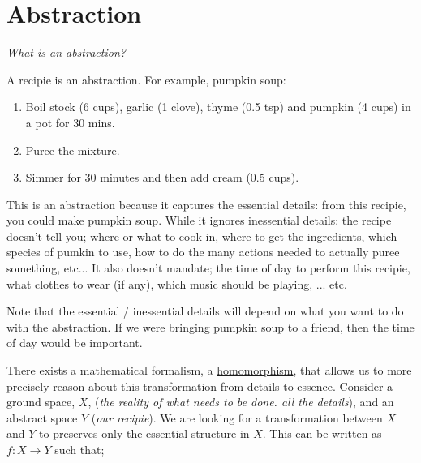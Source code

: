 \chapter{Abstraction}\label{C:abstraction}


\begin{displayquote}
 \textit{What is an abstraction?}
\end{displayquote}

A recipie is an abstraction. For example, pumpkin soup:

\begin{enumerate}
\tightlist
\item Boil stock (6 cups), garlic (1 clove), thyme (0.5 tsp) and pumpkin (4 cups) in a pot for 30 mins.
\item Puree the mixture.
\item Simmer for 30 minutes and then add cream (0.5 cups).
\end{enumerate}

This is an abstraction because it captures the essential details: from this recipie, you could make pumpkin soup.
While it ignores inessential details: the recipe doesn't tell you; where or what to cook in, where to get the
ingredients, which species of pumkin to use, how to do the many actions needed to actually puree something, etc...
It also doesn't mandate; the time of day to perform this recipie, what clothes to wear (if any),
which music should be playing, ... etc.

Note that the essential / inessential details will depend on what you want to do with the abstraction.
If we were bringing pumpkin soup to a friend, then the time of day would be important.

\vspace{5mm}

There exists a mathematical formalism, a  \href{https://en.wikipedia.org/wiki/Homomorphism}{homomorphism},
that allows us to more precisely reason about this transformation from
details to essence. Consider a ground space, $X$, (\textit{the reality of what
needs to be done. all the details}), and an abstract space $Y$ (\textit{our recipie}).
We are looking for a transformation between $X$ and $Y$ to preserves only the essential
structure in $X$. This can be written as $f: X\to Y$ such that;



